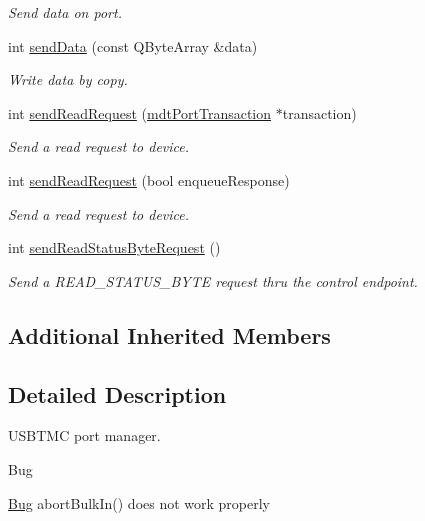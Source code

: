 \begin{DoxyCompactItemize}
\begin{DoxyCompactList}\small\item\em Send data on port. \end{DoxyCompactList}\item 
int \hyperlink{classmdt_usbtmc_port_manager_a6d566c68ddeb7c7ca14b5c70ae784efc}{send\-Data} (const Q\-Byte\-Array \&data)
\begin{DoxyCompactList}\small\item\em Write data by copy. \end{DoxyCompactList}\item 
int \hyperlink{classmdt_usbtmc_port_manager_a2920bdd6b189f198f132de9e5555a78b}{send\-Read\-Request} (\hyperlink{classmdt_port_transaction}{mdt\-Port\-Transaction} $\ast$transaction)
\begin{DoxyCompactList}\small\item\em Send a read request to device. \end{DoxyCompactList}\item 
int \hyperlink{classmdt_usbtmc_port_manager_ab1604a1c8f2e9192714d039dbf9a5158}{send\-Read\-Request} (bool enqueue\-Response)
\begin{DoxyCompactList}\small\item\em Send a read request to device. \end{DoxyCompactList}\item 
int \hyperlink{classmdt_usbtmc_port_manager_a7bcc280bd4a26ed523832550b1e61553}{send\-Read\-Status\-Byte\-Request} ()
\begin{DoxyCompactList}\small\item\em Send a R\-E\-A\-D\-\_\-\-S\-T\-A\-T\-U\-S\-\_\-\-B\-Y\-T\-E request thru the control endpoint. \end{DoxyCompactList}\end{DoxyCompactItemize}
\subsection*{Additional Inherited Members}


\subsection{Detailed Description}
U\-S\-B\-T\-M\-C port manager. 

\begin{DoxyRefDesc}{Bug}
\item[\hyperlink{bug__bug000001}{Bug}]abort\-Bulk\-In() does not work properly \end{DoxyRefDesc}



